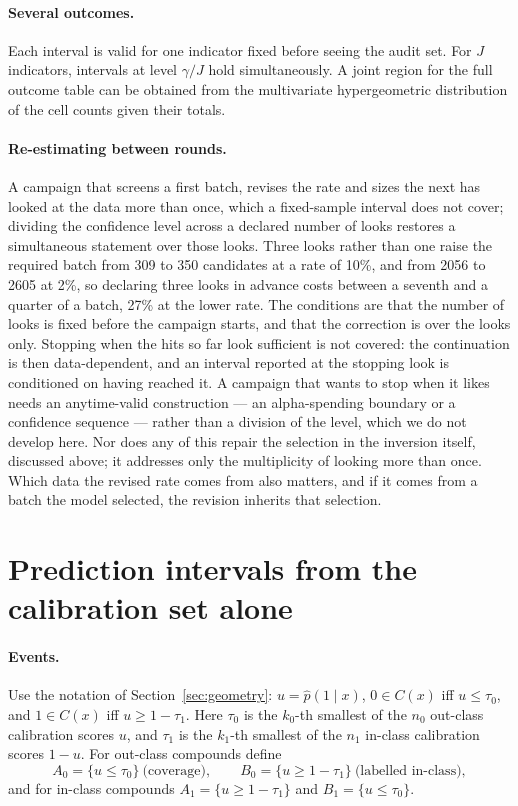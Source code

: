 \documentclass[10pt]{article}
\begin{document}
\paragraph{Several outcomes.} Each interval is valid for one indicator fixed before seeing the audit set. For $J$ indicators, intervals at level $\gamma/J$ hold simultaneously. A joint region for the full outcome table can be obtained from the multivariate hypergeometric distribution of the cell counts given their totals.



\paragraph{Re-estimating between rounds.} A campaign that screens a first batch, revises the rate and sizes the next has looked at the data more than once, which a fixed-sample interval does not cover; dividing the confidence level across a declared number of looks restores a simultaneous statement over those looks. Three looks rather than one raise the required batch from 309 to 350 candidates at a rate of 10\%, and from 2056 to 2605 at 2\%, so declaring three looks in advance costs between a seventh and a quarter of a batch, 27\% at the lower rate. The conditions are that the number of looks is fixed before the campaign starts, and that the correction is over the looks only. Stopping when the hits so far look sufficient is not covered: the continuation is then data-dependent, and an interval reported at the stopping look is conditioned on having reached it. A campaign that wants to stop when it likes needs an anytime-valid construction --- an alpha-spending boundary or a confidence sequence --- rather than a division of the level,\citep{LanDeMets1983,Howard2021Confseq,Ramdas2023Game} which we do not develop here. Nor does any of this repair the selection in the inversion itself, discussed above; it addresses only the multiplicity of looking more than once. Which data the revised rate comes from also matters, and if it comes from a batch the model selected, the revision inherits that selection.

\section{Prediction intervals from the calibration set alone}
\label{sec:calonly}

\paragraph{Events.} Use the notation of Section~\ref{sec:geometry}: $u=\hat p(1\mid x)$, $0\in C(x)$ iff $u\le\tau_0$, and $1\in C(x)$ iff $u\ge1-\tau_1$. Here $\tau_0$ is the $k_0$-th smallest of the $n_0$ out-class calibration scores $u$, and $\tau_1$ is the $k_1$-th smallest of the $n_1$ in-class calibration scores $1-u$. For out-class compounds define
\begin{equation}
A_0=\{u\le\tau_0\}\ \text{(coverage)},\qquad B_0=\{u\ge1-\tau_1\}\ \text{(labelled in-class)},
\end{equation}
and for in-class compounds $A_1=\{u\ge1-\tau_1\}$ and $B_1=\{u\le\tau_0\}$.
\end{document}
